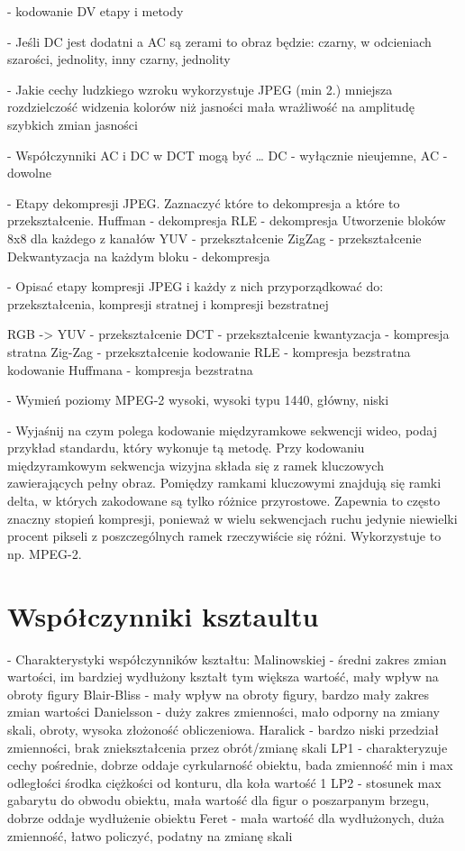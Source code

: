 \documentclass[a4paper, 12pt, titlepage]{article}
\begin{document}
- kodowanie DV etapy i metody


- Jeśli DC jest dodatni a AC są zerami to obraz będzie: czarny, w odcieniach szarości, jednolity, inny
czarny, jednolity

- Jakie cechy ludzkiego wzroku wykorzystuje JPEG (min 2.)
mniejsza rozdzielczość widzenia kolorów niż jasności
mała wrażliwość na amplitudę szybkich zmian jasności

- Współczynniki AC i DC w DCT mogą być …
DC - wyłącznie nieujemne,
AC - dowolne


- Etapy dekompresji JPEG. Zaznaczyć które to dekompresja a które to przekształcenie.
Huffman - dekompresja
RLE - dekompresja
Utworzenie bloków 8x8 dla każdego z kanałów YUV - przekształcenie
ZigZag - przekształcenie
Dekwantyzacja na każdym bloku - dekompresja


- Opisać etapy kompresji JPEG i każdy z nich przyporządkować do: przekształcenia, kompresji stratnej i kompresji bezstratnej

RGB -> YUV - przekształcenie
DCT - przekształcenie
kwantyzacja - kompresja stratna
Zig-Zag - przekształcenie
kodowanie RLE - kompresja bezstratna
kodowanie Huffmana - kompresja bezstratna

- Wymień poziomy MPEG-2 
wysoki, wysoki typu 1440,  główny,  niski

- Wyjaśnij na czym polega kodowanie międzyramkowe sekwencji wideo, podaj przykład standardu, który wykonuje tą metodę. 
Przy kodowaniu międzyramkowym sekwencja wizyjna składa się z ramek kluczowych zawierających pełny obraz. Pomiędzy ramkami kluczowymi znajdują się ramki delta, w których zakodowane są tylko różnice przyrostowe. Zapewnia to często znaczny stopień kompresji, ponieważ w wielu sekwencjach ruchu jedynie niewielki procent pikseli z poszczególnych ramek rzeczywiście się różni. Wykorzystuje to np. MPEG-2.

\pagebreak\section{Współczynniki ksztaultu}
- Charakterystyki współczynników kształtu:
Malinowskiej - średni zakres zmian wartości, im bardziej wydłużony kształt tym większa wartość, mały wpływ na obroty figury
Blair-Bliss - mały wpływ na obroty figury, bardzo mały zakres zmian wartości
Danielsson - duży zakres zmienności, mało odporny na zmiany skali, obroty, wysoka złożoność obliczeniowa.
Haralick - bardzo niski przedział zmienności, brak zniekształcenia przez obrót/zmianę skali
LP1 - charakteryzuje cechy pośrednie, dobrze oddaje cyrkularność obiektu, bada zmienność min i max odległości środka ciężkości od konturu, dla koła wartość 1
LP2 - stosunek max gabarytu do obwodu obiektu, mała wartość dla figur o poszarpanym brzegu, dobrze oddaje wydłużenie obiektu
Feret - mała wartość dla wydłużonych, duża zmienność, łatwo policzyć, podatny na zmianę skali
\end{document}
